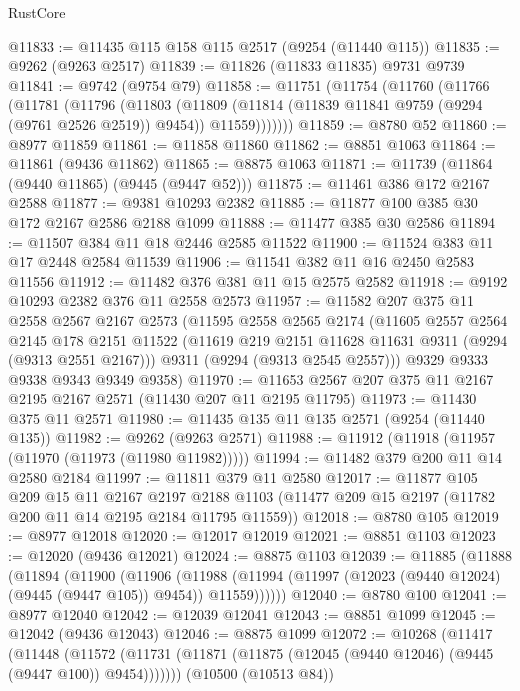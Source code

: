 \begin{lexlean}{RustCore}
\begin{coremodule}
@11833 := @11435 @115 @158 @115 @2517 (@9254 (@11440 @115))
@11835 := @9262 (@9263 @2517)
@11839 := @11826 (@11833 @11835) @9731 @9739
@11841 := @9742 (@9754 @79)
@11858 := @11751
    (@11754
      (@11760
        (@11766
          (@11781
            (@11796
              (@11803
                (@11809
                  (@11814 (@11839 @11841 @9759 (@9294 (@9761 @2526 @2519)) @9454))
                  @11559)))))))
@11859 := @8780 @52
@11860 := @8977 @11859
@11861 := @11858 @11860
@11862 := @8851 @1063
@11864 := @11861 (@9436 @11862)
@11865 := @8875 @1063
@11871 := @11739 (@11864 (@9440 @11865) (@9445 (@9447 @52)))
@11875 := @11461 @386 @172 @2167 @2588
@11877 := @9381 @10293 @2382
@11885 := @11877 @100 @385 @30 @172 @2167 @2586 @2188 @1099
@11888 := @11477 @385 @30 @2586
@11894 := @11507 @384 @11 @18 @2446 @2585 @11522
@11900 := @11524 @383 @11 @17 @2448 @2584 @11539
@11906 := @11541 @382 @11 @16 @2450 @2583 @11556
@11912 := @11482 @376 @381 @11 @15 @2575 @2582
@11918 := @9192 @10293 @2382 @376 @11 @2558 @2573
@11957 := @11582
    @207
    @375
    @11
    @2558
    @2567
    @2167
    @2573
    (@11595
      @2558
      @2565
      @2174
      (@11605
        @2557
        @2564
        @2145
        @178
        @2151
        @11522
        (@11619 @219 @2151 @11628 @11631 @9311 (@9294 (@9313 @2551 @2167)))
        @9311
        (@9294 (@9313 @2545 @2557)))
      @9329
      @9333
      @9338
      @9343
      @9349
      @9358)
@11970 := @11653 @2567 @207 @375 @11 @2167 @2195 @2167 @2571 (@11430 @207 @11 @2195 @11795)
@11973 := @11430 @375 @11 @2571
@11980 := @11435 @135 @11 @135 @2571 (@9254 (@11440 @135))
@11982 := @9262 (@9263 @2571)
@11988 := @11912 (@11918 (@11957 (@11970 (@11973 (@11980 @11982)))))
@11994 := @11482 @379 @200 @11 @14 @2580 @2184
@11997 := @11811 @379 @11 @2580
@12017 := @11877
    @105
    @209
    @15
    @11
    @2167
    @2197
    @2188
    @1103
    (@11477 @209 @15 @2197 (@11782 @200 @11 @14 @2195 @2184 @11795 @11559))
@12018 := @8780 @105
@12019 := @8977 @12018
@12020 := @12017 @12019
@12021 := @8851 @1103
@12023 := @12020 (@9436 @12021)
@12024 := @8875 @1103
@12039 := @11885
    (@11888
      (@11894
        (@11900
          (@11906
            (@11988 (@11994 (@11997 (@12023 (@9440 @12024) (@9445 (@9447 @105)) @9454)) @11559))))))
@12040 := @8780 @100
@12041 := @8977 @12040
@12042 := @12039 @12041
@12043 := @8851 @1099
@12045 := @12042 (@9436 @12043)
@12046 := @8875 @1099
@12072 := @10268
    (@11417
      (@11448
        (@11572 (@11731 (@11871 (@11875 (@12045 (@9440 @12046) (@9445 (@9447 @100)) @9454)))))))
    (@10500 (@10513 @84))

\end{coremodule}
\end{lexlean}
